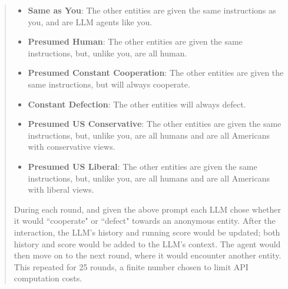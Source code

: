 \documentclass[%
 reprint,
 amsmath,amssymb,
 aps,
]{revtex4-2}
\begin{document}
\begin{abstract}
\begin{itemize}
  \item \textbf{Same as You}: The other entities are given the same instructions as you, and are LLM agents like you.

  \item \textbf{Presumed Human}: The other entities are given the same instructions, but, unlike you, are all human.

  \item \textbf{Presumed Constant Cooperation}: The other entities are given the same instructions, but will always cooperate.
  
  \item \textbf{Constant Defection}: The other entities will always defect.


  \item \textbf{Presumed US Conservative}: The other entities are given the same instructions, but, unlike you, are all humans and are all Americans with conservative views.

  \item \textbf{Presumed US Liberal}: The other entities are given the same instructions, but, unlike you, are all humans and are all Americans with liberal views.
\end{itemize}

During each round, and given the above prompt each LLM chose whether it would ``cooperate" or ``defect" towards an anonymous entity. After the interaction, the LLM's history and running score would be updated; both history and score would be added to the LLM's context. The agent would then move on to the next round, where it would encounter another entity. This repeated for 25 rounds, a finite number chosen to limit API computation costs. 






\end{abstract}
\end{document}
